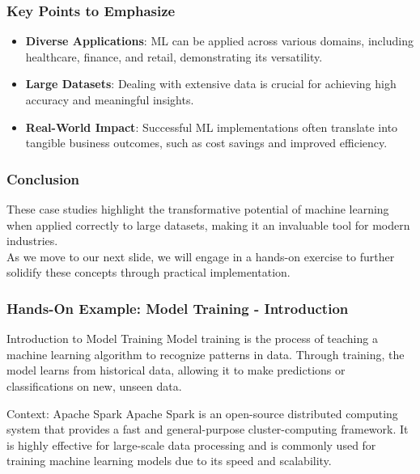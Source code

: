 \documentclass[aspectratio=169]{beamer}
\begin{document}
\begin{frame}[fragile]
    \frametitle{Key Points to Emphasize}
    \begin{itemize}
        \item \textbf{Diverse Applications}: ML can be applied across various domains, including healthcare, finance, and retail, demonstrating its versatility.
        \item \textbf{Large Datasets}: Dealing with extensive data is crucial for achieving high accuracy and meaningful insights.
        \item \textbf{Real-World Impact}: Successful ML implementations often translate into tangible business outcomes, such as cost savings and improved efficiency.
    \end{itemize}
\end{frame}

\begin{frame}[fragile]
    \frametitle{Conclusion}
    These case studies highlight the transformative potential of machine learning when applied correctly to large datasets, making it an invaluable tool for modern industries. 
    \\[1em]
    As we move to our next slide, we will engage in a hands-on exercise to further solidify these concepts through practical implementation.
\end{frame}

\begin{frame}[fragile]
    \frametitle{Hands-On Example: Model Training - Introduction}
    \begin{block}{Introduction to Model Training}
        Model training is the process of teaching a machine learning algorithm to recognize patterns in data.
        Through training, the model learns from historical data, allowing it to make predictions or classifications on new, unseen data.
    \end{block}

    \begin{block}{Context: Apache Spark}
        Apache Spark is an open-source distributed computing system that provides a fast and general-purpose cluster-computing framework. 
        It is highly effective for large-scale data processing and is commonly used for training machine learning models due to its speed and scalability.
    \end{block}
\end{frame}
\end{document}
